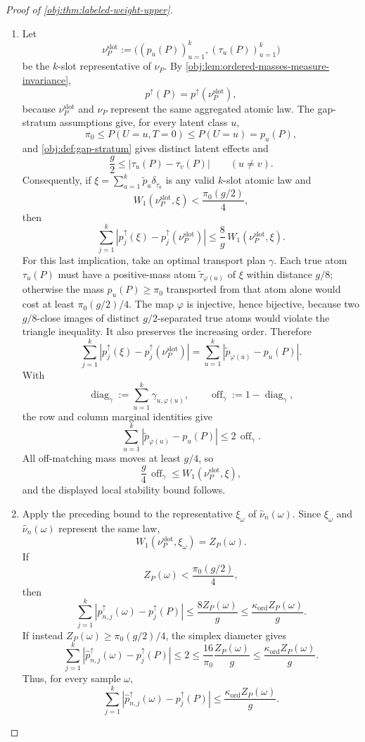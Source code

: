 \begin{proof}[Proof of \cref{obj:thm:labeled-weight-upper}]
\begin{enumerate}
\item
Let
\[
\nu_P^{\mathrm{slot}}
:=
\bigl((p_u(P))_{u=1}^k,(\tau_u(P))_{u=1}^k\bigr)
\]
be the \(k\)-slot representative of \(\nu_P\).  By \cref{obj:lem:ordered-masses-measure-invariance},
\[
p^{\uparrow}(P)=p^{\uparrow}\!\left(\nu_P^{\mathrm{slot}}\right),
\]
because \(\nu_P^{\mathrm{slot}}\) and \(\nu_P\) represent the same aggregated atomic law.  The gap-stratum assumptions give, for every latent class \(u\),
\[
\pi_0\le P(U=u,T=0)\le P(U=u)=p_u(P),
\]
and \cref{obj:def:gap-stratum} gives distinct latent effects and
\[
\frac g2\le |\tau_u(P)-\tau_v(P)|\qquad (u\ne v).
\]
Consequently, if \(\xi=\sum_{a=1}^k \widetilde p_a\delta_{\widetilde\tau_a}\) is any valid \(k\)-slot atomic law and
\[
W_1\!\left(\nu_P^{\mathrm{slot}},\xi\right)
<
\frac{\pi_0(g/2)}{4},
\]
then
\[
\sum_{j=1}^k
\left|p_j^{\uparrow}(\xi)-p_j^{\uparrow}(\nu_P^{\mathrm{slot}})\right|
\le
\frac{8}{g}\,
W_1\!\left(\nu_P^{\mathrm{slot}},\xi\right).
\]
For this last implication, take an optimal transport plan \(\gamma\).  Each true atom \(\tau_u(P)\) must have a positive-mass atom \(\widetilde\tau_{\varphi(u)}\) of \(\xi\) within distance \(g/8\); otherwise the mass \(p_u(P)\ge\pi_0\) transported from that atom alone would cost at least \(\pi_0(g/2)/4\).  The map \(\varphi\) is injective, hence bijective, because two \(g/8\)-close images of distinct \(g/2\)-separated true atoms would violate the triangle inequality.  It also preserves the increasing order.  Therefore
\[
\sum_{j=1}^k
\left|p_j^{\uparrow}(\xi)-p_j^{\uparrow}(\nu_P^{\mathrm{slot}})\right|
=
\sum_{u=1}^k
\left|\widetilde p_{\varphi(u)}-p_u(P)\right|.
\]
With
\[
\operatorname{diag}_{\gamma}:=\sum_{u=1}^k\gamma_{u,\varphi(u)},
\qquad
\operatorname{off}_{\gamma}:=1-\operatorname{diag}_{\gamma},
\]
the row and column marginal identities give
\[
\sum_{u=1}^k
\left|\widetilde p_{\varphi(u)}-p_u(P)\right|
\le 2\,\operatorname{off}_{\gamma}.
\]
All off-matching mass moves at least \(g/4\), so
\[
\frac g4\,\operatorname{off}_{\gamma}
\le W_1\!\left(\nu_P^{\mathrm{slot}},\xi\right),
\]
and the displayed local stability bound follows. %

\item
Apply the preceding bound to the representative \(\xi_\omega\) of \(\widehat\nu_n(\omega)\).  Since \(\xi_\omega\) and \(\widehat\nu_n(\omega)\) represent the same law,
\[
W_1\!\left(\nu_P^{\mathrm{slot}},\xi_\omega\right)=Z_P(\omega).
\]
If
\[
Z_P(\omega)<\frac{\pi_0(g/2)}4,
\]
then
\[
\sum_{j=1}^k
\left|\widehat p_{n,j}^{\uparrow}(\omega)-p_j^{\uparrow}(P)\right|
\le
\frac{8 Z_P(\omega)}{g}
\le
\frac{\kappa_{\mathrm{ord}} Z_P(\omega)}{g}.
\]
If instead \(Z_P(\omega)\ge \pi_0(g/2)/4\), the simplex diameter gives
\[
\sum_{j=1}^k
\left|\widehat p_{n,j}^{\uparrow}(\omega)-p_j^{\uparrow}(P)\right|
\le 2
\le
\frac{16}{\pi_0}\frac{Z_P(\omega)}{g}
\le
\frac{\kappa_{\mathrm{ord}} Z_P(\omega)}{g}.
\]
Thus, for every sample \(\omega\),
\[
\sum_{j=1}^k
\left|\widehat p_{n,j}^{\uparrow}(\omega)-p_j^{\uparrow}(P)\right|
\le
\frac{\kappa_{\mathrm{ord}} Z_P(\omega)}{g}.
\] %


\end{enumerate}
\end{proof}
